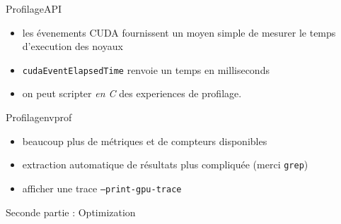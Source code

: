 \documentclass[11pt,mathserif]{beamer}
\newcommand{\argi}{\faLightbulbO}
\newcommand{\kontuz}{\faExclamationTriangle}
\newcommand{\pozik}{\faSmileO}
\newcommand{\triste}{\faFrownO}
\begin{document}
\begin{frame}{Profilage}{API}
  \begin{itemize}[<+->]
    \item[\argi] les évenements CUDA fournissent un moyen simple de mesurer le temps d'execution des noyaux
\begin{center}
  
\end{center}
   \item[\kontuz] \texttt{cudaEventElapsedTime} renvoie un temps en milliseconds
   \item[\pozik] on peut scripter {\em en C} des experiences de profilage.
  \end{itemize}
\end{frame}

\begin{frame}{Profilage}{nvprof}
  \begin{itemize}[<+->]
    \item[\pozik] beaucoup plus de métriques et de compteurs disponibles
    \item[\triste] extraction automatique de résultats plus compliquée (merci \texttt{grep})
    \item[\argi] afficher une trace {\tt --print-gpu-trace }
  \end{itemize}
\pause
\end{frame}

\begin{frame}
  \begin{center}
    {\Huge Seconde partie : Optimization}
  \end{center}
\end{frame}
\end{document}
